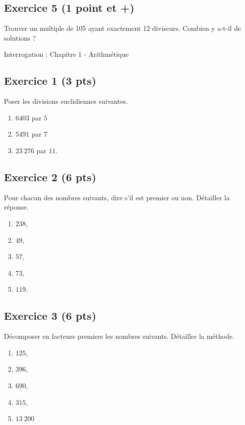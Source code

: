 \documentclass[14 pt]{extarticle}
\theoremstyle{plain}
\begin{document}
\subsection*{Exercice 5 (1 point et +)}

Trouver un multiple de 105 ayant exactement 12 diviseurs. Combien y a-t-il de solutions ?
\newpage\begin{center}{\Large Interrogation : Chapitre 1 - Arithmétique}\\ 
 \end{center}


\subsection*{Exercice 1 (3 pts)}
 Poser les divisions euclidiennes suivantes. 
 
 
 \begin{enumerate}
 \item $6403$ par $5$
 \item $5491$ par $7$ 
 \item $23~276$ par $11$. 
 \end{enumerate}
 \subsection*{Exercice 2 (6 pts)}
 
 Pour chacun des nombres suivants, dire s'il est premier ou non. Détailler la réponse. 
\begin{enumerate}
\item $238$,
\item $49$,
\item $57$,
\item $73$,
\item $119$.
\end{enumerate}

\subsection*{Exercice 3 (6 pts)}
Décomposer en facteurs premiers les nombres suivants. Détailler la méthode. 

\begin{enumerate}
\item $125$,
\item $396$,
\item $690$,
\item $315$,
\item $13~200$
\end{enumerate}
\end{document}
